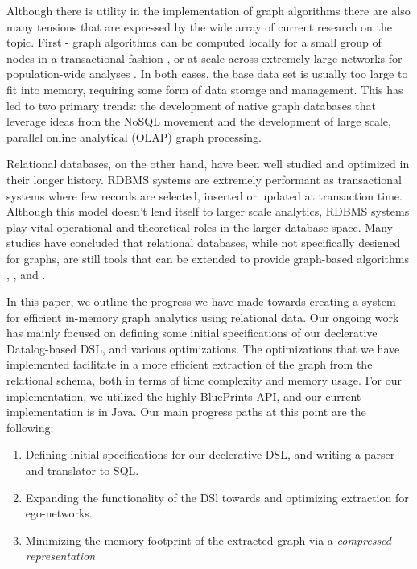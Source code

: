 \documentclass[11pt,letterpaper]{article}
\begin{document}
Although there is utility in the implementation of graph algorithms there are also many tensions that are expressed by the wide array of current research on the topic. First - graph algorithms can be computed locally for a small group of nodes in a transactional fashion \cite{jadhav_comparative_2014}, or at scale across extremely large networks for population-wide analyses \cite{cuzzocrea_big_2014}. In both cases, the base data set is usually too large to fit into memory, requiring some form of data storage and management. This has led to two primary trends: the development of native graph databases that leverage ideas from the NoSQL movement and the development of large scale, parallel online analytical (OLAP) graph processing.

Relational databases, on the other hand, have been well studied and optimized in their longer history. RDBMS systems are extremely performant as transactional systems where few records are selected, inserted or updated at transaction time. Although this model doesn't lend itself to larger scale analytics, RDBMS systems play vital operational and theoretical roles in the larger database space. Many studies have concluded that relational databases, while not specifically designed for graphs, are still tools that can be extended to provide graph-based algorithms \cite{welc_graph_2013}, \cite{najork_hammers_2012}, and \cite{vicknair_comparison_2010}.

In this paper, we outline the progress we have made towards creating a system for efficient in-memory graph analytics using relational data. Our ongoing work has mainly focused on defining some initial specifications of our declerative Datalog-based DSL, and various optimizations. The optimizations that we have implemented facilitate in a more efficient extraction of the graph from the relational schema, both in terms of time complexity and memory usage. For our implementation, we utilized the highly BluePrints API, and our current implementation is in Java. Our main progress paths at this point are the following:\\

\begin{enumerate}

	\item Defining initial specifications for our declerative DSL, and writing a parser and translator to SQL.
	\item Expanding the functionality of the DSl towards and optimizing extraction for ego-networks.
	\item Minimizing the memory footprint of the extracted graph via a \textit{compressed representation} %

\end{enumerate}
\end{document}
